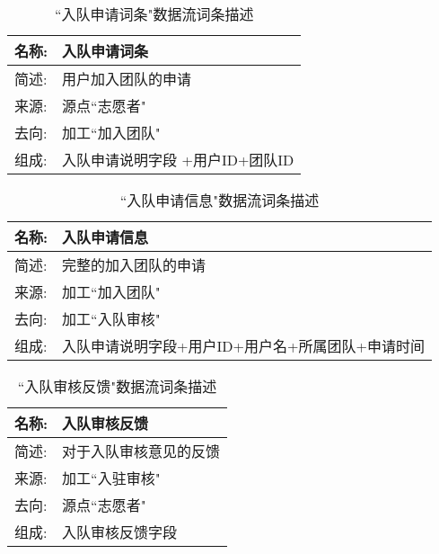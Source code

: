 \begin{table}[H]  
\caption{``入队申请词条"数据流词条描述}  
\begin{center}  
    \begin{tabular}{l p{11cm}} 
        \hline
        \quad 名称:  &   入队申请词条 \\
        \hline
        \quad 简述:  & 用户加入团队的申请 \\
        \hline
        \quad 来源:  & 源点``志愿者"\\
        \hline
        \quad 去向:  & 加工``加入团队" \\
        \hline
        \quad 组成:  & 入队申请说明字段 +用户ID+团队ID\\
        \hline
    \end{tabular}
    \label{tab1}
\end{center}
\end{table}

\begin{table}[H]  
\caption{``入队申请信息"数据流词条描述}  
\begin{center}  
    \begin{tabular}{l p{11cm}} 
        \hline
        \quad 名称:  &   入队申请信息 \\
        \hline
        \quad 简述:  & 完整的加入团队的申请 \\
        \hline
        \quad 来源:  & 加工``加入团队"\\
        \hline
        \quad 去向:  & 加工``入队审核" \\
        \hline
        \quad 组成:  & 入队申请说明字段+用户ID+用户名+所属团队+申请时间\\
        \hline
    \end{tabular}
    \label{tab1}
\end{center}
\end{table}


\begin{table}[H]  
\caption{``入队审核反馈"数据流词条描述}  
\begin{center}  
    \begin{tabular}{l p{11cm}} 
        \hline
        \quad 名称:  &   入队审核反馈 \\
        \hline
        \quad 简述:  & 对于入队审核意见的反馈 \\
        \hline
        \quad 来源:  & 加工``入驻审核" \\
        \hline
        \quad 去向:  & 源点``志愿者" \\
        \hline
        \quad 组成:  & 入队审核反馈字段\\
        \hline
    \end{tabular}
    \label{tab1}
\end{center}
\end{table}